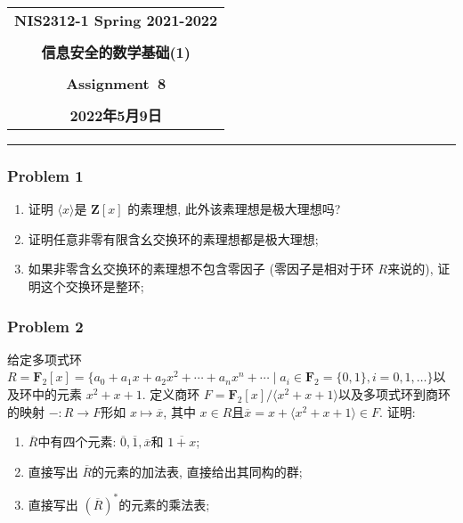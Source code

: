 \documentclass[a4paper,12pt]{ctexart}
\newcommand{\Z}{\mathbf{Z}}
\newcommand{\F}{\mathbf{F}}
\begin{document}
  \begin{center}

  \vspace{-0.3in}
  \begin{tabular}{c}
    \textbf{\Large NIS2312-1 Spring 2021-2022} \\
    \textbf{\Large  } \\
    \textbf{\Large  信息安全的数学基础(1)} \\
    \textbf{\Large  } \\
    \textbf{\Large  Assignment~8} \\
    \textbf{\Large  } \\
    \textbf{\Large 2022年5月9日} \\
  \end{tabular}
  \end{center}
  \noindent
  \rule{\linewidth}{0.4pt}

\subsubsection*{Problem 1}
    \begin{enumerate}
      \item 证明 $ \langle x\rangle $是 $ \Z[x] $ 的素理想, 此外该素理想是极大理想吗?
      \item 证明任意非零有限含幺交换环的素理想都是极大理想;
      \item 如果非零含幺交换环的素理想不包含零因子 (零因子是相对于环 $ R $来说的), 证明这个交换环是整环;
    \end{enumerate}
\subsubsection*{Problem 2}
   给定多项式环 $ R=\F_2[x]=\{a_0+a_1x+a_2x^2+\cdots+a_nx^n+\cdots\mid a_i\in\F_2=\{0,1\},i=0,1,\dots\} $以及环中的元素 $ x^2+x+1 $. 
   定义商环 $ F=\F_2[x]/\langle x^2+x+1\rangle $以及多项式环到商环的映射 $ -:R\rightarrow F $形如
   $ x\mapsto \overline{x} $, 其中 $ x\in R $且$ \overline{x}=x+\langle x^2+x+1\rangle\in F $.
   证明:
   \begin{enumerate}
     \item $ \overline{R} $中有四个元素: $ \overline{0},\overline{1},\overline{x} $和 $ \overline{1+x} $;
     \item 直接写出 $ \overline{R} $的元素的加法表, 直接给出其同构的群;
     \item 直接写出 $ (\overline{R})^* $的元素的乘法表;
   \end{enumerate}
\end{document}
